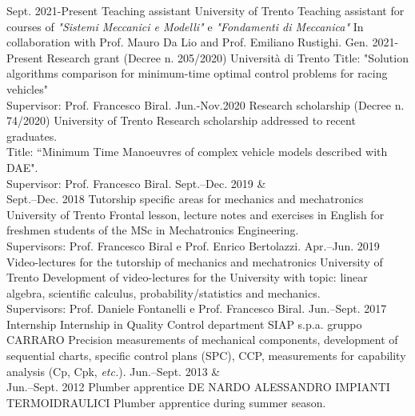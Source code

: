 \documentclass[9pt]{developercv} %
\begin{document}
%
\begin{entrylist}
	\entry
		{Sept. 2021-Present}
		{Teaching assistant}
		{University of Trento}
		{Teaching assistant for courses of \textit{"Sistemi Meccanici e Modelli"} e \textit{"Fondamenti di Meccanica"} In collaboration with Prof. Mauro Da Lio and Prof. Emiliano Rustighi.}
	\entry
		{Gen. 2021-Present}
		{Research grant (Decree n. 205/2020)}
		{Università di Trento}
		{Title: "Solution algorithms comparison for minimum-time optimal control problems for racing vehicles"\\
		Supervisor: Prof. Francesco Biral.}
	\entry
		{Jun.-Nov.2020}
		{Research scholarship (Decree n. 74/2020)}
		{University of Trento}
		{Research scholarship addressed to recent graduates.\\ 
		Title: “Minimum Time Manoeuvres of complex vehicle models described with DAE".\\ 
		Supervisor: Prof. Francesco Biral.}
	\entry
		{Sept.--Dec. 2019 \&\\Sept.--Dec. 2018}
		{Tutorship specific areas for mechanics and mechatronics}
		{University of Trento}
		{Frontal lesson, lecture notes and exercises in English for freshmen students of the MSc in Mechatronics Engineering.\\
		Supervisors: Prof. Francesco Biral e Prof. Enrico Bertolazzi.}
	\entry
		{Apr.--Jun. 2019}
		{Video-lectures for the tutorship of mechanics and mechatronics}
		{University of Trento}
		{Development of video-lectures for the University with topic: linear algebra, scientific calculus, probability/statistics and mechanics.\\
		Supervisors: Prof. Daniele Fontanelli e Prof. Francesco Biral.}
	\entry
		{Jun.--Sept. 2017\\\footnotesize{Internship}}
		{Internship in Quality Control department}
		{SIAP s.p.a. gruppo CARRARO}
		{Precision measurements of mechanical components, development of sequential charts, specific control plans (SPC), CCP, measurements for capability analysis (Cp, Cpk, \textit{etc.}).
		}
	\entry
		{Jun.--Sept. 2013 \&\\Jun.--Sept. 2012}
		{Plumber apprentice}
		{DE NARDO ALESSANDRO IMPIANTI TERMOIDRAULICI}
		{Plumber apprentice during summer season.}
\end{entrylist}
%
%
%
\end{document}
